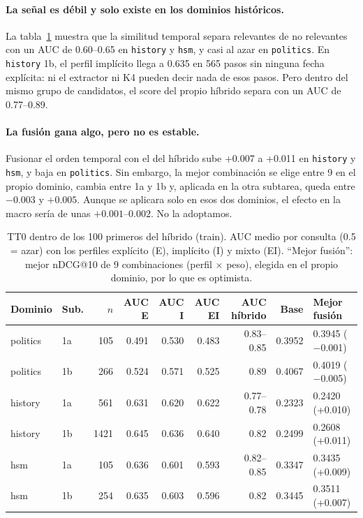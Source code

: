 \documentclass[11pt,a4paper]{article}
\begin{document}
\paragraph{La señal es débil y solo existe en los dominios históricos.} La tabla~\ref{tab:tt0} muestra que la similitud temporal separa relevantes de no relevantes con un AUC de 0.60--0.65 en \texttt{history} y \texttt{hsm}, y casi al azar en \texttt{politics}. En \texttt{history} 1b, el perfil implícito llega a 0.635 en 565 pasos sin ninguna fecha explícita: ni el extractor ni K4 pueden decir nada de esos pasos. Pero dentro del mismo grupo de candidatos, el score del propio híbrido separa con un AUC de 0.77--0.89.

\paragraph{La fusión gana algo, pero no es estable.} Fusionar el orden temporal con el del híbrido sube +0.007 a +0.011 en \texttt{history} y \texttt{hsm}, y baja en \texttt{politics}. Sin embargo, la mejor combinación se elige entre 9 en el propio dominio, cambia entre 1a y 1b y, aplicada en la otra subtarea, queda entre $-0.003$ y $+0.005$. Aunque se aplicara solo en esos dos dominios, el efecto en la macro sería de unas $+0.001$--$0.002$. No la adoptamos.

\begin{table}[t]
\centering
\caption{TT0 dentro de los 100 primeros del híbrido (train). AUC medio por consulta (0.5 = azar) con los perfiles explícito (E), implícito (I) y mixto (EI). ``Mejor fusión'': mejor nDCG@10 de 9 combinaciones (perfil $\times$ peso), elegida en el propio dominio, por lo que es optimista.}
\label{tab:tt0}
\small
\begin{tabular}{llrrrrrrl}
\toprule
Dominio & Sub. & $n$ & AUC E & AUC I & AUC EI & AUC híbrido & Base & Mejor fusión \\
\midrule
politics & 1a & 105  & 0.491 & 0.530 & 0.483 & 0.83--0.85 & 0.3952 & 0.3945 ($-$0.001) \\
politics & 1b & 266  & 0.524 & 0.571 & 0.525 & 0.89 & 0.4067 & 0.4019 ($-$0.005) \\
history  & 1a & 561  & 0.631 & 0.620 & 0.622 & 0.77--0.78 & 0.2323 & 0.2420 (+0.010) \\
history  & 1b & 1421 & 0.645 & 0.636 & 0.640 & 0.82 & 0.2499 & 0.2608 (+0.011) \\
hsm      & 1a & 105  & 0.636 & 0.601 & 0.593 & 0.82--0.85 & 0.3347 & 0.3435 (+0.009) \\
hsm      & 1b & 254  & 0.635 & 0.603 & 0.596 & 0.82 & 0.3445 & 0.3511 (+0.007) \\
\bottomrule
\end{tabular}
\end{table}
\end{document}
